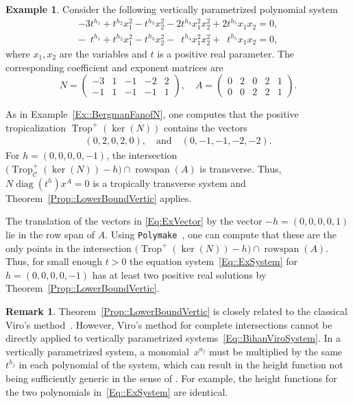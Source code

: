 \documentclass{article}
\theoremstyle{definition}
\newtheorem{example}[theorem]{Example}
\newtheorem{remark}[theorem]{Remark}
\DeclareMathOperator{\Trop}{Trop}
\DeclareMathOperator{\rowspan}{rowspan}
\DeclareMathOperator{\diag}{diag}
\begin{document}
\begin{example}
\label{Ex::VertParamBound}
Consider the following vertically parametrized polynomial system
\begin{equation}
\label{Eq::ExSystem}
    \begin{aligned}
    -3t^{h_1}  + t^{h_2} x_1^2  - t^{h_3} x_2^2 - 2t^{h_4} x_1^2 x_2^2+2t^{h_5} x_1 x_2 = 0, \\
     -\phantom{3}t^{h_1}  + t^{h_2} x_1^2  - t^{h_3} x_2^2 -  \phantom{2}t^{h_4} x_1^2 x_2^2+\phantom{2}t^{h_5}x_1 x_2 = 0,
\end{aligned}
\end{equation}
where $x_1,x_2$ are the variables and $t$ is a positive real parameter. The corresponding coefficient and exponent matrices are
  \[  N = \begin{pmatrix}
    -3 & 1 & -1 & -2 & 2 \\
    -1 & 1 & -1 & -1 & 1
\end{pmatrix}, \quad   A =  \begin{pmatrix}
         0 & 2 & 0 & 2 & 1\\
         0 & 0 & 2 & 2 & 1
    \end{pmatrix}. \]

    As in Example~\ref{Ex::BergmanFanofN}, one computes that the positive tropicalization $\Trop^+(\ker(N))$ contains the vectors 
    \begin{align}
    \label{Eq:ExVector}
    (0,2,0,2,0), \quad \text{and} \quad (0,-1,-1,-2,-2).
    \end{align}
    For $h = (0,0,0,0,-1)$, the intersection $\big(\Trop_\mathcal{C}^+(\ker(N)) - h \big) \cap \rowspan(A)$ is transverse. Thus, $N\diag(t^h)x^A=0$ is a tropically transverse system and Theorem~\ref{Prop::LowerBoundVertic} applies.

   The translation of the vectors in \eqref{Eq:ExVector} by the vector $-h = (0,0,0,0,1)$ lie in the row span of $A$. Using \texttt{Polymake}~\cite{POLYMAKE}, one can compute that these are the only points in the intersection $\big(\Trop^+(\ker(N)) - h \big) \cap \rowspan(A)$. Thus, for small enough $t > 0$ the equation system~\eqref{Eq::ExSystem} for $h = (0,0,0,0,-1)$ has at least two positive real solutions by Theorem~\ref{Prop::LowerBoundVertic}.
\end{example}


\begin{remark}
\label{Remark:ViroforVertParam}
Theorem~\ref{Prop::LowerBoundVertic} is closely related to the classical Viro's method~\cite{Viro_Dissertation,Bernd::Patchworking}. However, Viro's method for complete intersections \cite[Theorem 4]{Bernd::Patchworking} cannot be directly applied to vertically parametrized systems~\eqref{Eq::BihanViroSystem}. In a vertically parametrized system, a monomial~$x^{a_j}$ must be multiplied by the same $t^{h_j}$ in each polynomial of the system, which can result in the height function not being sufficiently generic in the sense of \cite{Bernd::Patchworking}. For example, the height functions for the two polynomials in~\eqref{Eq::ExSystem} are identical.
\end{remark}
\end{document}
